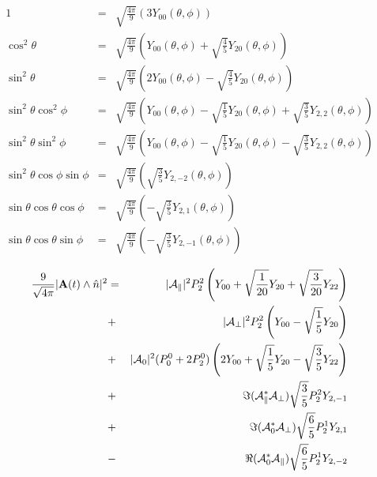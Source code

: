 \documentclass[a4paper,9pt,twoside]{article}
\begin{document}
\begin{eqnarray}
  1                       &=& \sqrt{ \frac{4\pi}{9} } \left( 3 Y_{00}(\theta,\phi) \right) \\
  \cos^2\theta            &=& \sqrt{ \frac{4\pi}{9} } \left( Y_{00}(\theta,\phi) + \sqrt{\frac{4}{5}}Y_{20}(\theta,\phi)\right)\\
  \sin^2\theta            &=& \sqrt{ \frac{4\pi}{9} } \left( 2Y_{00}(\theta,\phi) - \sqrt{\frac{4}{5}}Y_{20}(\theta,\phi)\right)\\
  \sin^2\theta \cos^2\phi &=& \sqrt{ \frac{4\pi}{9} } \left( Y_{00}(\theta,\phi) - \sqrt{\frac{1}{5} }Y_{20}(\theta,\phi) +\sqrt{\frac{3}{5}} Y_{2,2}(\theta,\phi)\right) \\
  \sin^2\theta \sin^2\phi &=& \sqrt{ \frac{4\pi}{9} } \left( Y_{00}(\theta,\phi) - \sqrt{\frac{1}{5} }Y_{20}(\theta,\phi) -\sqrt{\frac{3}{5}} Y_{2,2}(\theta,\phi)\right) \\
  \sin^2\theta\cos\phi\sin\phi &=& \sqrt{ \frac{4\pi}{9}} \left(\sqrt{\frac{3}{5}} Y_{2,-2}(\theta,\phi) \right) \\
  \sin\theta\cos\theta\cos\phi &=& \sqrt{ \frac{4\pi}{9}}\left( -\sqrt{\frac{3}{5}}Y_{2,1}(\theta,\phi)\right) \\ 
  \sin\theta\cos\theta\sin\phi &=& \sqrt{ \frac{4\pi}{9}}\left( -\sqrt{\frac{3}{5}}Y_{2,-1}(\theta,\phi) \right)
\end{eqnarray}

\begin{eqnarray}
\frac{9 }{\sqrt{4\pi}} |{ \bf A}(t) \wedge \hat{n}|^2 
                              &=&|{\cal A}_\parallel|^2 P_2^2 \left( Y_{00}+\sqrt{\frac{1}{20}}Y_{20}+\sqrt{\frac{3}{20}}Y_{22}  \right)  \\
                              &+&|{\cal A}_\perp|^2  P_2^2 \left( Y_{00} - \sqrt{\frac{1}{5}}Y_{20}\right)\\
                              &+&|{\cal A}_0|^2  (P_0^0+2P_2^0 ) \left( 2 Y_{00}+\sqrt{\frac{1}{5}}Y_{20}-\sqrt{\frac{3}{5}}Y_{22} \right) \\
                              &+&\Im({\cal A}_\parallel^*{\cal A}_\perp) \sqrt{\frac{3}{5}}P_2^2 Y_{2,-1}  \\
                              &+&\Im({\cal A}_0^* {\cal A}_\perp )       \sqrt{\frac{6}{5}}P_2^1Y_{2,1} \\
                              &-&\Re({\cal A}_0^*{\cal A}_\parallel  )   \sqrt{\frac{6}{5}}P_2^1 Y_{2,-2} 
\end{eqnarray}
\end{document}
